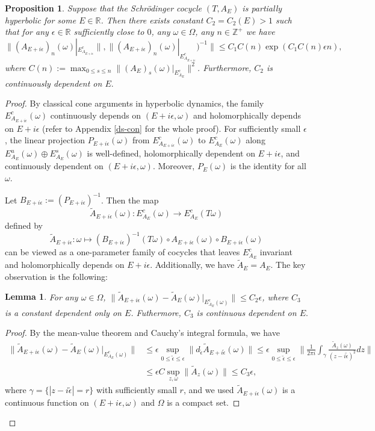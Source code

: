 \documentclass[11pt]{amsart}
\newtheorem{lemma}[theorem]{Lemma}
\newtheorem{prop}[theorem]{Proposition}
\theoremstyle{remark}
\theoremstyle{definition}
\newcommand{\RR}{{\mathbb R}}
\newcommand{\ZZ}{{\mathbb Z}}
\begin{document}
\begin{prop}\label{prop: variation center}Suppose that the  Schr\"odinger cocycle  $(T, A_E)$ is partially hyperbolic for some $E\in \RR$. Then there exists constant $C_2=C_2(E)>1$ 
such that for any $\epsilon\in \RR$ sufficiently close to $0$, any $\omega\in \Omega$, any $n\in \ZZ^+$ we have 
\begin{equation*}\label{eqn: est center variation}
\| (A_{E+i\epsilon})_{ n} (\omega)|_{E^c_{A_{E+i\epsilon}}}\|, \| (A_{E+i\epsilon})_{ n} (\omega)|_{E^c_{A_{E+i\epsilon}}})^{-1}\|  \leq  C_1C(n)\exp (C_1C(n)\epsilon n),
\end{equation*}
 where  $C(n):=\max_{0\leq s\leq n}\|(A_E)_{s}(\omega)|_{E^c_{A_E}}\|^2$. Furthermore, $C_2$ is continuously dependent  on $E.$
\end{prop}
\begin{proof}
By classical cone arguments in hyperbolic dynamics, the family $E^c_{A_{E+i\epsilon}}(\omega)$ continuously depends on $(E+i\epsilon,\omega)$ and holomorphically depends on $E+i\epsilon$ (refer to Appendix \ref{ds-con} for the whole proof). For sufficiently small $\epsilon$, the linear projection $P_{E+i\epsilon}(\omega)$ from $E^c_{A_{E+i\epsilon}}(\omega)$ to $E^c_{A_E}(\omega)$ along $E^{u}_{A_E}(\omega)\oplus E^s_{A_E}(\omega)$ is well-defined, holomorphically dependent on $E+i\epsilon$, and continuously dependent on $(E+i\epsilon,\omega)$. Moreover, $P_E(\omega)$ is the identity for all $\omega$.

Let $B_{E+i\epsilon}:=(P_{E+i\epsilon})^{-1}$. Then the map $$
\tilde A_{E+i\epsilon}(\omega): E^c_{A_E}(\omega)\to E^c_{A_E}(T\omega)
$$ defined by $$
\tilde A_{E+i\epsilon}: \omega\mapsto (B_{E+i\epsilon})^{-1}(T\omega)\circ A_{E+i\epsilon}(\omega)\circ B_{E+i\epsilon}(\omega)
$$ can be viewed as a one-parameter family of cocycles that leaves $E^c_{A_E}$ invariant and holomorphically depends on $E+i\epsilon$. Additionally, we have $\tilde A_E=A_E$. The key observation is the following:
\begin{lemma}\label{lip1}
For any \(\omega\in\Omega\), \(\|\tilde A_{E+i\epsilon}(\omega)-\tilde A_{E}(\omega)|_{E^c_{A_E}(\omega)}\|\leq C_2\epsilon\), where \(C_3\) is a constant dependent only on \(E\). Futhermore, $C_3$ is continuous dependent on $E.$
\end{lemma}
\begin{proof}
By the mean-value theorem and Cauchy's integral formula, we have
$$
 	\begin{aligned}
 		\|\tilde A_{E+i\epsilon}(\omega)-\tilde A_{E}(\omega)|_{E^c_{A_E}(\omega)}\|&\leq \epsilon \sup_{0\leq\tilde\epsilon\leq\epsilon} \|d_{\tilde\epsilon} \tilde A_{E+i\tilde\epsilon}(\omega)\|\leq \epsilon \sup_{0\leq\tilde\epsilon\leq\epsilon} \|\frac{1}{2\pi i}\int_{\gamma}\frac{ \tilde A_{z}(\omega)}{(z-i\tilde\epsilon)^2}dz
 		 \|\\&\leq \epsilon C\sup_{z,\omega}  \|\tilde A_{z}(\omega)\|\leq C_3\epsilon ,
 	\end{aligned}
 $$
 where  $\gamma=\{|z-i\tilde\epsilon|=r\}$ with sufficiently small $r$, and  we used  $\tilde A_{E+i\epsilon}(\omega)$ is a continuous function on $(E+i\epsilon,\omega)$ and $\Omega$ is a compact set. 
 \end{proof}
 

\end{proof}
\end{document}
